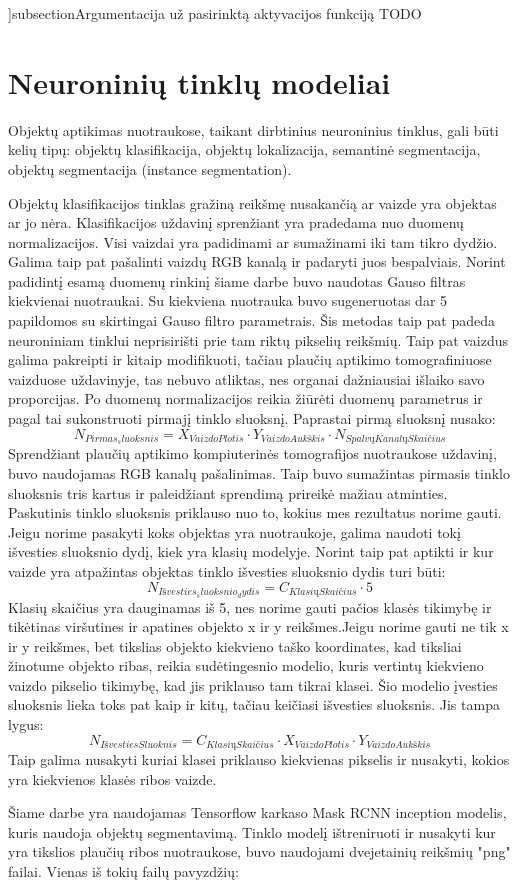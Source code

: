 \documentclass{VUMIFInfKursinis}
\begin{document}
]subsection{Argumentacija už pasirinktą aktyvacijos funkciją}
TODO
\section{Neuroninių tinklų modeliai}
\par
Objektų aptikimas nuotraukose, taikant dirbtinius neuroninius tinklus, gali būti kelių
tipų: objektų klasifikacija, objektų lokalizacija, semantinė segmentacija,
objektų segmentacija (instance segmentation).
 \par
 Objektų klasifikacijos tinklas gražiną reikšmę nusakančią ar vaizde yra objektas
 ar jo nėra. Klasifikacijos uždavinį sprenžiant yra pradedama nuo duomenų normalizacijos.
 Visi vaizdai yra padidinami ar sumažinami iki tam tikro dydžio. Galima taip pat pašalinti
 vaizdų RGB kanalą ir padaryti juos bespalviais. Norint padidintį esamą duomenų rinkinį šiame
 darbe buvo naudotas Gauso filtras kiekvienai nuotraukai. Su kiekviena nuotrauka buvo sugeneruotas dar
 5 papildomos su skirtingai Gauso filtro parametrais. Šis metodas taip pat padeda neuroniniam
 tinklui neprisirišti prie tam riktų pikselių reikšmių. Taip pat vaizdus galima pakreipti ir kitaip
 modifikuoti, tačiau plaučių aptikimo tomografiniuose vaizduose uždavinyje, tas nebuvo
 atliktas, nes organai dažniausiai išlaiko savo proporcijas. Po duomenų normalizacijos reikia
 žiūrėti duomenų parametrus ir pagal tai sukonstruoti pirmajį tinklo sluoksnį. Paprastai pirmą sluoksnį
 nusako:
 \[
N_{Pirmas_sluoksnis} = X_{VaizdoPlotis} \cdot Y_{VaizdoAukškis} \cdot N_{SpalvųKanalųSkaičius}
 \]
Sprendžiant plaučių aptikimo kompiuterinės tomografijos nuotraukose uždavinį, buvo naudojamas
RGB kanalų pašalinimas. Taip buvo sumažintas pirmasis tinklo sluoksnis tris kartus ir paleidžiant
sprendimą prireikė mažiau atminties. Paskutinis tinklo sluoksnis priklauso nuo to, kokius mes
rezultatus norime gauti. Jeigu norime pasakyti koks objektas yra nuotraukoje, galima naudoti
tokį išvesties sluoksnio dydį, kiek yra klasių modelyje. Norint taip pat aptikti ir kur
vaizde yra atpažintas objektas tinklo išvesties sluoksnio dydis turi būti:
\[
  N_{Išvesties_sluoksnio_dydis} = C_{KlasiųSkaičius} \cdot 5
\]
Klasių skaičius yra dauginamas iš 5, nes norime gauti pačios klasės tikimybę ir tikėtinas
viršutines ir apatines objekto x ir y reikšmes.Jeigu norime gauti ne tik x ir y reikšmes, bet tikslias
objekto kiekvieno taško koordinates, kad tiksliai žinotume objekto ribas, reikia sudėtingesnio modelio,
kuris vertintų kiekvieno vaizdo pikselio tikimybę, kad jis priklauso tam tikrai klasei.
Šio modelio įvesties sluoksnis lieka toks pat kaip ir kitų, tačiau keičiasi išvesties sluoksnis. Jis tampa
lygus:
\[
N_{IšvestiesSluoknis} = C_{KlasiųSkaičius} \cdot X_{VaizdoPlotis} \cdot Y_{VaizdoAukškis}
\]
Taip galima nusakyti kuriai klasei priklauso kiekvienas pikselis ir nusakyti, kokios yra
kiekvienos klasės ribos vaizde.
\par
Šiame darbe yra naudojamas Tensorflow karkaso Mask RCNN inception modelis, kuris naudoja
objektų segmentavimą. Tinklo modelį ištreniruoti ir nusakyti kur yra tikslios plaučių
ribos nuotraukose, buvo naudojami dvejetainių reikšmių "png" failai. Vienas iš tokių
failų pavyzdžių:
\end{document}
